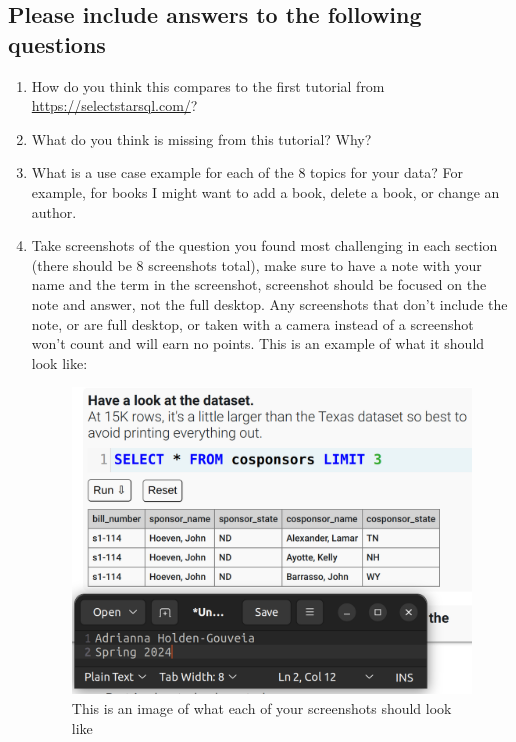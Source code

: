 \documentclass[12pt]{article}
\begin{document}
\subsection*{Please include answers to the following questions}
    \begin{enumerate}
        \item How do you think this compares to the first tutorial from  \url{https://selectstarsql.com/}?
        \item What do you think is missing from this tutorial? Why?
        \item What is a use case example for each of the 8 topics for your data?  For example, for books I might want to add a book, delete a book, or change an author.  
        \item Take screenshots of the question you found most challenging in each section (there should be 8 screenshots total), make sure to have a note with your name and the term in the screenshot, screenshot should be focused on the note and answer, not the full desktop.  Any screenshots that don't include the note, or are full desktop, or taken with a camera instead of a screenshot won't count and will earn no points. This is an example of what it should look like:        
 
        \begin{figure}[h!]
            \centerline{\includegraphics[scale=.2]{Examplewk6.png}}
            \caption{This is an image of what each of your screenshots should look like}

            \end{figure} 
    \end{enumerate}
\end{document}

